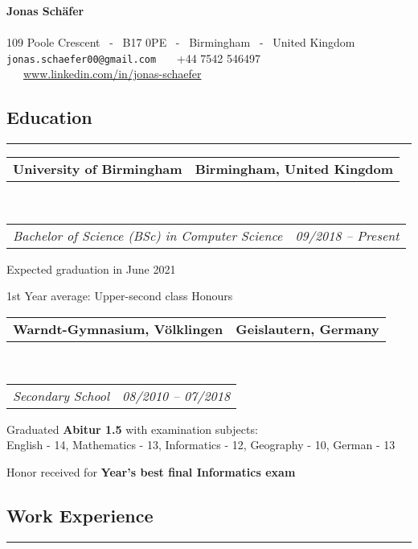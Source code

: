 \documentclass[10pt,letterpaper]{article}
\makeatletter
\newcommand{\headerrow}[2]
{\begin{tabular*}{\linewidth}{l@{\extracolsep{\fill}}r}
	#1 &
	#2 \\
\end{tabular*}}
\makeatother
\begin{document}
\begin{center}
{\LARGE \textbf{Jonas Schäfer}}
\\
\ \\
109 Poole Crescent \ - \ B17 0PE \ - \ Birmingham \ - \ United Kingdom
\\
\texttt{jonas.schaefer00@gmail.com} \ \textbullet \ \ +44 7542 546497 \ \textbullet \ \ \href{https://www.linkedin.com/in/jonas-schaefer/}{www.linkedin.com/in/jonas-schaefer}
\end{center}

\subsection*{\Large{Education}}
\hrule
\vspace{0.4em}

\noindent
\headerrow{\textbf{University of Birmingham}}{\textbf{Birmingham, United Kingdom}}
\\
\headerrow{\emph{Bachelor of Science (BSc) in Computer Science}}{\emph{09/2018 -- Present}}
\vspace{-1.6em}
\begin{itemize*}
    \item Expected graduation in June 2021
    \item 1st Year average: Upper-second class Honours
\end{itemize*}

\noindent
\headerrow{\textbf{Warndt-Gymnasium, Völklingen}}{\textbf{Geislautern, Germany}}
\\
\headerrow{\emph{Secondary School}}{\emph{08/2010 -- 07/2018}}
\vspace{-1.6em}
\begin{itemize*}
	\item Graduated \textbf{Abitur 1.5} with examination subjects:\\
       English - 14, Mathematics - 13, Informatics - 12, Geography - 10,
       German - 13
    \item Honor received for \textbf{Year's best final Informatics exam}
\end{itemize*}


\subsection*{\Large{Work Experience}}
\hrule
\vspace{0.4em}
\end{document}

